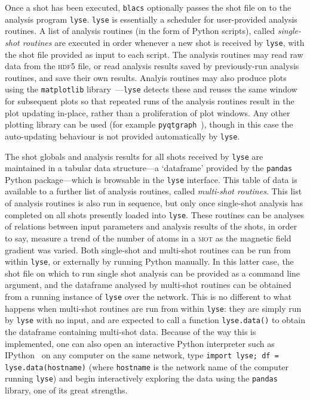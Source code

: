Once a shot has been executed, \texttt{blacs} optionally passes the shot file on to the analysis program \texttt{lyse}. \texttt{lyse} is essentially a scheduler for user-provided analysis routines. A list of analysis routines (in the form of Python scripts), called \emph{single-shot routines} are executed in order whenever a new shot is received by \texttt{lyse}, with the shot file provided as input to each script. The analysis routines may read raw data from the \textsc{hdf5} file, or read analysis results saved by previously-run analysis routines, and save their own results. Analyis routines may also produce plots using the \texttt{matplotlib} library~\cite{Hunter:2007}---\texttt{lyse} detects these and reuses the same window for subsequent plots so that repeated runs of the analysis routines result in the plot updating in-place, rather than a proliferation of plot windows. Any other plotting library can be used (for example \texttt{pyqtgraph}~\cite{campagnola_pyqtgraph_2016}), though in this case the auto-updating behaviour is not provided automatically by \texttt{lyse}.

The shot globals and analysis results for all shots received by \texttt{lyse} are maintained in a tabular data structure---a `dataframe' provided by the \texttt{pandas}~\cite{mckinney-proc-scipy-2010} Python package---which is browsable in the \texttt{lyse} interface. This table of data is available to a further list of analysis routines, called \emph{multi-shot routines}. This list of analysis routines is also run in sequence, but only once single-shot analysis has completed on all shots presently loaded into \texttt{lyse}. These routines can be analyses of relations between input parameters and analysis results of the shots, in order to say, measure a trend of the number of atoms in a \textsc{mot} as the magnetic field gradient was varied. Both single-shot and multi-shot routines can be run from within \texttt{lyse}, or externally by running Python manually. In this latter case, the shot file on which to run single shot analysis can be provided as a command line argument, and the dataframe analysed by multi-shot routines can be obtained from a running instance of \texttt{lyse} over the network. This is no different to what happens when multi-shot routines are run from within \texttt{lyse}: they are simply run by \texttt{lyse} with no input, and are expected to call a function \texttt{lyse.data()} to obtain the dataframe containing multi-shot data. Because of the way this is implemented, one can also open an interactive Python interpreter such as IPython~\cite{perez_ipython:_2007} on any computer on the same network, type \texttt{import lyse; df = lyse.data(hostname)} (where \texttt{hostname} is the network name of the computer running \texttt{lyse}) and begin interactively exploring the data using the \texttt{pandas} library, one of its great strengths.

